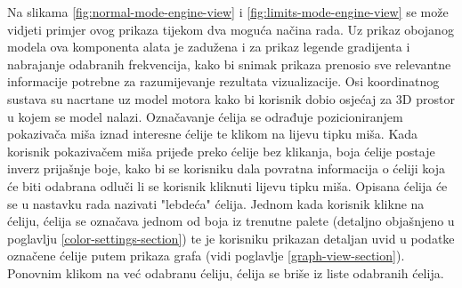 \documentclass[times, utf8, diplomski]{fer}
\begin{document}
Na slikama \ref{fig:normal-mode-engine-view} i \ref{fig:limits-mode-engine-view} se može vidjeti primjer ovog prikaza tijekom dva moguća načina rada. Uz prikaz obojanog modela ova komponenta alata je zadužena i za prikaz legende gradijenta i nabrajanje odabranih frekvencija, kako bi snimak prikaza prenosio sve relevantne informacije potrebne za razumijevanje rezultata vizualizacije. Osi koordinatnog sustava su nacrtane uz model motora kako bi korisnik dobio osjećaj za 3D prostor u kojem se model nalazi. Označavanje ćelija se odrađuje pozicioniranjem pokazivača miša iznad interesne ćelije te klikom na lijevu tipku miša. Kada korisnik pokazivačem miša prijeđe preko ćelije bez klikanja, boja ćelije postaje inverz prijašnje boje, kako bi se korisniku dala povratna informacija o ćeliji koja će biti odabrana odluči li se korisnik kliknuti lijevu tipku miša. Opisana ćelija će se u nastavku rada nazivati "lebdeća" ćelija. Jednom kada korisnik klikne na ćeliju, ćelija se označava jednom od boja iz trenutne palete (detaljno objašnjeno u poglavlju \ref{color-settings-section}) te je korisniku prikazan detaljan uvid u podatke označene ćelije putem prikaza grafa (vidi poglavlje \ref{graph-view-section}). Ponovnim klikom na već odabranu ćeliju, ćelija se briše iz liste odabranih ćelija.\\
\end{document}
